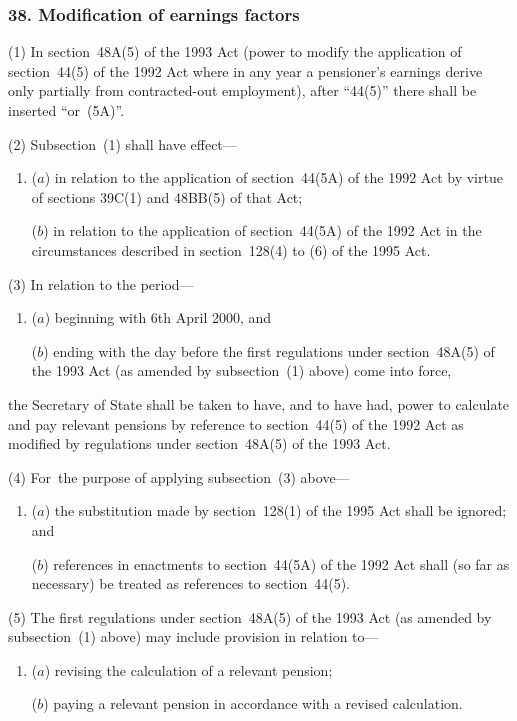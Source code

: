 \documentclass[12pt,a4paper]{article}
\begin{document}
\subsubsection{38. Modification of earnings factors}

(1) In section~48A(5)  of the 1993 Act (power to modify the application of section~44(5)  of the 1992 Act where in any year a pensioner’s earnings derive only partially from contracted-out employment), after “44(5)” there shall be inserted “or~(5A)”.

(2) Subsection~(1)  shall have effect—
\begin{enumerate}\item[]
($a$) in relation to the application of section~44(5A)  of the 1992 Act by virtue of sections 39C(1)  and 48BB(5)  of that Act;

($b$) in relation to the application of section~44(5A)  of the 1992 Act in the circumstances described in section~128(4)  to (6)  of the 1995 Act.
\end{enumerate}

(3) In relation to the period—
\begin{enumerate}\item[]
($a$) beginning with 6th April 2000, and

\begin{sloppypar}
($b$) ending with the day before the first regulations under section~48A(5)  of the 1993 Act (as amended by subsection~(1)  above) come into force,
\end{sloppypar}
\end{enumerate}
the Secretary of State shall be taken to have, and to have had, power to calculate and pay relevant pensions by reference to section~44(5)  of the 1992 Act as modified by regulations under section~48A(5)  of the 1993 Act.

(4) For~the purpose of applying subsection~(3)  above—
\begin{enumerate}\item[]
($a$) the substitution made by section~128(1)  of the 1995 Act shall be ignored; and

($b$) references in enactments to section~44(5A)  of the 1992 Act shall (so far as necessary) be treated as references to section~44(5).
\end{enumerate}

(5) The first regulations under section~48A(5)  of the 1993 Act (as amended by subsection~(1)  above) may include provision in relation to—
\begin{enumerate}\item[]
($a$) revising the calculation of a relevant pension;

($b$) paying a relevant pension in accordance with a revised calculation.
\end{enumerate}
\end{document}
